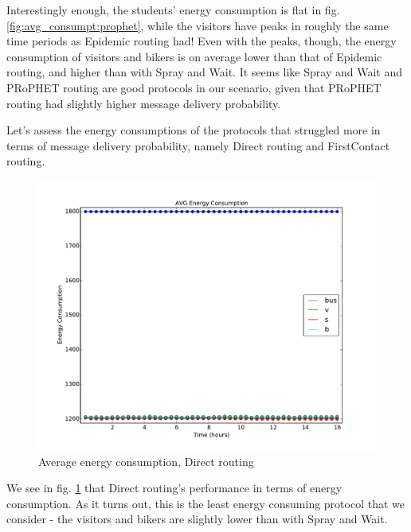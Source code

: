 \documentclass[conference]{IEEEtran}
\begin{document}
Interestingly enough, the students' energy consumption is flat in fig. \ref{fig:avg_consumpt:prophet}, while the visitors have peaks in roughly the same time periods as Epidemic routing had! Even with the peaks, though, the energy consumption of visitors and bikers is on average lower than that of Epidemic routing, and higher than with Spray and Wait. It seems like Spray and Wait and PRoPHET routing are good protocols in our scenario, given that PRoPHET routing had slightly higher message delivery probability.

Let's assess the energy consumptions of the protocols that struggled more in terms of message delivery probability, namely Direct routing and FirstContact routing.

\begin{figure}
  \includegraphics[scale=0.25, center]{../one_1.5.1-RC2/plots/Direct_AVG_ENERGY_CONSUMPTION.pdf}
  \caption{Average energy consumption, Direct routing}
  \label{fig:avg_consumpt:direct}
\end{figure}

We see in fig. \ref{fig:avg_consumpt:direct} that Direct routing's performance in terms of energy consumption. As it turns out, this is the least energy consuming protocol that we consider - the visitors and bikers are slightly lower than with Spray and Wait.
\end{document}
